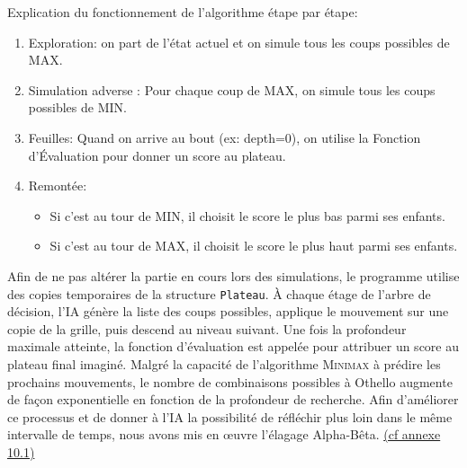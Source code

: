 \documentclass{article}
\begin{document}
Explication du fonctionnement de l'algorithme étape par étape: 
\begin{enumerate}
\item Exploration: on part de l'état actuel et on simule tous les coups possibles de MAX.
\item Simulation adverse : Pour chaque coup de MAX, on simule tous les coups possibles de MIN.
\item Feuilles: Quand on arrive au bout (ex: depth=0), on utilise la Fonction d'Évaluation pour donner un score au plateau.
\item Remontée:
\begin{itemize}
\item Si c'est au tour de MIN, il choisit le score le plus bas parmi ses enfants.
\item Si c'est au tour de MAX, il choisit le score le plus haut parmi ses enfants.
\end{itemize}
\end{enumerate}
Afin de ne pas altérer la partie en cours lors des simulations, le programme utilise des copies temporaires de la structure \texttt{Plateau}. À chaque étage de l'arbre de décision, l'IA génère la liste des coups possibles, applique le mouvement sur une copie de la grille, puis descend au niveau suivant. Une fois la profondeur maximale atteinte, la fonction d'évaluation est appelée pour attribuer un score au plateau final imaginé.
\medskip
Malgré la capacité de l'algorithme \textsc{Minimax} à prédire les prochains mouvements, le nombre de combinaisons possibles à Othello augmente de façon exponentielle en fonction de la profondeur de recherche. Afin d'améliorer ce processus et de donner à l'IA la possibilité de réfléchir plus loin dans le même intervalle de temps, nous avons mis en œuvre l'élagage Alpha-Bêta. \hyperref[alg:minimax]{(cf annexe 10.1)}
\end{document}
